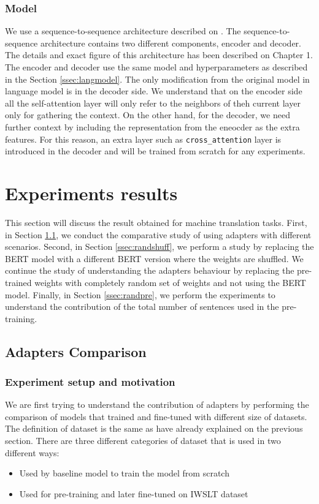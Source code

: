 \subsubsection{Model}
We use a sequence-to-sequence architecture described on \cite{vaswani2017attention}. The sequence-to-sequence architecture contains two different components, encoder and decoder. The details and exact figure of this architecture has been described on Chapter 1. The encoder and decoder use the same model and hyperparameters as described in the Section \ref{ssec:langmodel}. The only modification from the original model in language model is in the decoder side. We understand that on the encoder side all the self-attention layer will only refer to the neighbors of theh current layer only for gathering the context. On the other hand, for the decoder, we need further context by including the representation from the eneocder as the extra features. For this reason, an extra layer such as \texttt{cross\_attention} layer is introduced in the decoder and will be trained from scratch for any experiments.

\section{Experiments results}
This section will discuss the result obtained for machine translation tasks. First, in Section \ref{ssec:adaptcomp}, we conduct the comparative study of using adapters with different scenarios. Second, in Section \ref{ssec:randshuff}, we perform a study by replacing the BERT model with a different BERT version where the weights are shuffled. We continue the study of understanding the adapters behaviour by replacing the pre-trained weights with completely random set of weights and not using the BERT model. Finally, in Section \ref{ssec:randpre}, we perform the experiments to understand the contribution of the total number of sentences used in the pre-training.

\subsection{Adapters Comparison}
\label{ssec:adaptcomp}
\subsubsection{Experiment setup and motivation}
We are first trying to understand the contribution of adapters by performing the comparison of models that trained and fine-tuned with different size of datasets. The definition of dataset is the same as have already explained on the previous section. There are three different categories of dataset that is used in two different ways:
\begin{itemize}
    \item Used by baseline model to train the model from scratch
    \item Used for pre-training and later fine-tuned on IWSLT dataset
\end{itemize}

